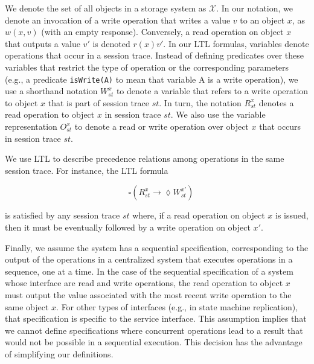 \documentclass[journal,compsoc]{IEEEtran}
\begin{document}
\newtheorem{definition}{Definition}



We denote the set of all objects in a storage system as $\mathcal{X}$. In our notation, we denote an invocation of a write operation that writes a value $v$ to an object $x$, as $w(x,v)$ (with an empty response). Conversely, a read operation on object $x$ that outputs a value $v'$ is denoted $r(x){v'}$.
In our LTL formulas, variables denote operations that occur in a session trace.  
Instead of defining predicates over these variables that restrict the type of operation or the corresponding parameters (e.g., a predicate {\tt isWrite(A)} to mean that variable A is a write operation), we use a shorthand notation $W^{x}_{st}$ to denote a variable that refers to a write operation to object $x$ that is part of session trace $st$. In turn, the notation $R^{x}_{st}$ denotes a read operation to object $x$ in session trace $st$. We also use the variable representation $O^{x}_{st}$ to denote a read or write operation over object $x$ that occurs in session trace $st$.

We use LTL to describe precedence relations among operations in the same session trace. For instance, the LTL formula

$$ \quad \square \left( R_\mathit{st}^x \rightarrow \lozenge W_\mathit{st}^{x'} \right) $$

\noindent is satisfied by any session trace $st$ where, if a read operation on object $x$ is issued, then it must be eventually followed by a write operation on object $x'$. 

Finally, we assume the system has a sequential specification, %
 corresponding to the output of the operations in a centralized system that executes operations in a sequence, one at a time. In the case of the sequential specification of a system whose interface are read and write operations, the read operation to object $x$ must output the value associated with the most recent write operation to the same object $x$. For other types of interfaces (e.g., in state machine replication), that specification %
 is specific to the service interface. %
This assumption implies that we cannot define specifications where concurrent operations lead to a result that would not be possible in a sequential execution. This decision has the advantage of simplifying our definitions. 
 
\end{document}

